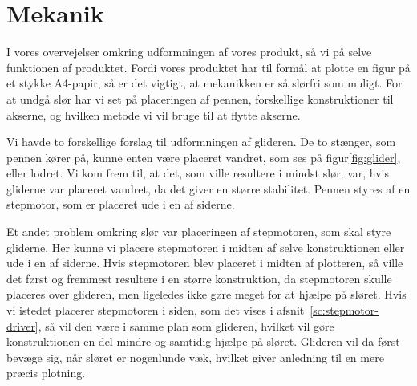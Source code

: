 \chapter[Design af mekanik]{Mekanik}


I vores overvejelser omkring udformningen af vores produkt, så vi på
selve funktionen af produktet. Fordi vores produktet har til formål at
plotte en figur på et stykke A4-papir, så er det vigtigt, at
mekanikken er så slørfri som muligt. For at undgå slør har vi set på
placeringen af pennen, forskellige konstruktioner til akserne, og
hvilken metode vi vil bruge til at flytte akserne.

Vi havde to forskellige forslag til udformningen af glideren. De to
stænger, som pennen kører på, kunne enten være placeret vandret, som
ses på figur\vref{fig:glider}, eller lodret. Vi kom frem
til, at det, som ville resultere i mindst slør, var, hvis gliderne var
placeret vandret, da det giver en større stabilitet. Pennen styres af en stepmotor, som er placeret ude i
en af siderne.


Et andet problem omkring slør var placeringen af stepmotoren, som skal
styre gliderne. Her kunne vi placere stepmotoren i midten af selve
konstruktionen eller ude i en af siderne. Hvis
stepmotoren blev placeret i midten af plotteren, så ville det først og
fremmest resultere i en større konstruktion, da stepmotoren skulle
placeres over glideren, men ligeledes ikke gøre meget for at hjælpe på
sløret. Hvis vi istedet placerer stepmotoren i siden, som det vises i
afsnit~\vref{sc:stepmotor-driver}, så vil den være i
samme plan som glideren, hvilket vil gøre konstruktionen en del
mindre og samtidig hjælpe på sløret. Glideren vil da først bevæge sig,
når sløret er nogenlunde væk, hvilket giver anledning til en mere
præcis plotning.

